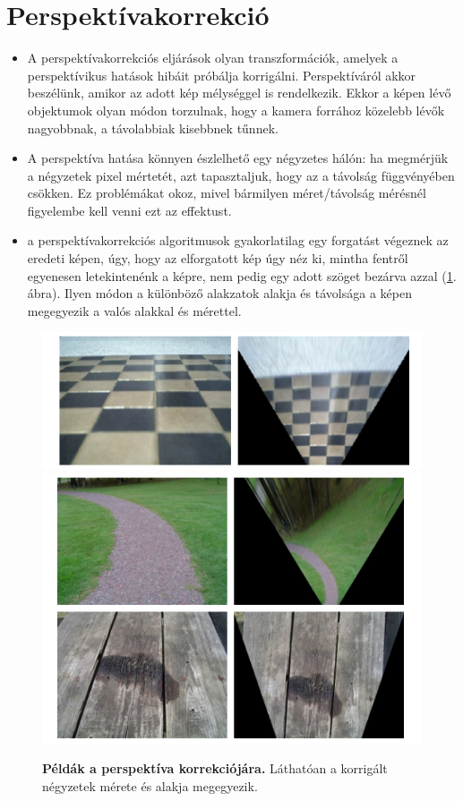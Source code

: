 \documentclass[12pt]{article}
\theoremstyle{plain}
\begin{document}
\section{Perspektívakorrekció}
\begin{itemize}
    
\item A perspektívakorrekciós eljárások olyan transzformációk, amelyek a perspektívikus hatások hibáit próbálja korrigálni. Perspektíváról akkor beszélünk, amikor az adott kép mélységgel is rendelkezik. Ekkor a képen lévő objektumok olyan módon torzulnak, hogy a kamera forrához közelebb lévők nagyobbnak, a távolabbiak kisebbnek tűnnek. 

\item A perspektíva hatása könnyen észlelhető egy négyzetes hálón: ha megmérjük a négyzetek pixel mértetét, azt tapasztaljuk, hogy az a távolság függvényében csökken. Ez problémákat okoz, mivel bármilyen méret/távolság mérésnél figyelembe kell venni ezt az effektust.

\item a perspektívakorrekciós algoritmusok gyakorlatilag egy forgatást végeznek az eredeti képen, úgy, hogy az elforgatott kép úgy néz ki, mintha fentről egyenesen letekintenénk a képre, nem pedig egy adott szöget bezárva azzal (\ref{fig:pers}. ábra). Ilyen módon a különböző alakzatok alakja és távolsága a képen megegyezik a valós alakkal és mérettel.

\end{itemize}{}

\begin{figure}[H]
    \begin{center}
    \includegraphics[width=0.75\linewidth]{media/p1.png}
    \includegraphics[width=0.75\linewidth]{media/p2.png}
    \caption{\textbf{Példák a perspektíva korrekciójára.} Láthatóan a korrigált négyzetek mérete és alakja megegyezik.} 
    \label{fig:pers}
    \end{center}
\end{figure}
\end{document}
